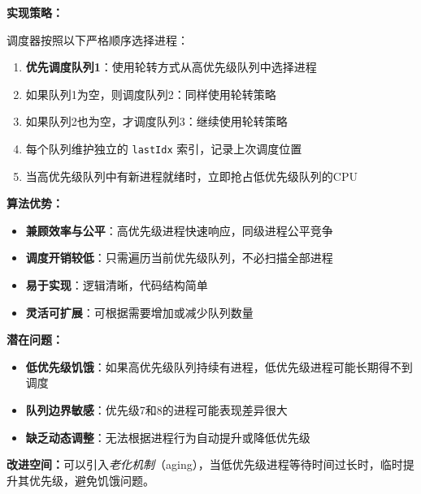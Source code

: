\documentclass[a4paper, 12pt]{article}
\begin{document}
    \textbf{实现策略：}
    
    调度器按照以下严格顺序选择进程：
    \begin{enumerate}[itemsep=2pt]
        \item \textbf{优先调度队列1}：使用轮转方式从高优先级队列中选择进程
        \item 如果队列1为空，则调度队列2：同样使用轮转策略
        \item 如果队列2也为空，才调度队列3：继续使用轮转策略
        \item 每个队列维护独立的 \texttt{lastIdx} 索引，记录上次调度位置
        \item 当高优先级队列中有新进程就绪时，立即抢占低优先级队列的CPU
    \end{enumerate}
    
    \textbf{算法优势：}
    \begin{itemize}[itemsep=0pt]
        \item \textbf{兼顾效率与公平}：高优先级进程快速响应，同级进程公平竞争
        \item \textbf{调度开销较低}：只需遍历当前优先级队列，不必扫描全部进程
        \item \textbf{易于实现}：逻辑清晰，代码结构简单
        \item \textbf{灵活可扩展}：可根据需要增加或减少队列数量
    \end{itemize}
    
    \textbf{潜在问题：}
    \begin{itemize}[itemsep=0pt]
        \item \textbf{低优先级饥饿}：如果高优先级队列持续有进程，低优先级进程可能长期得不到调度
        \item \textbf{队列边界敏感}：优先级7和8的进程可能表现差异很大
        \item \textbf{缺乏动态调整}：无法根据进程行为自动提升或降低优先级
    \end{itemize}
    
    \textbf{改进空间：}可以引入\textit{老化机制}（aging），当低优先级进程等待时间过长时，临时提升其优先级，避免饥饿问题。
    
    
\end{document}
